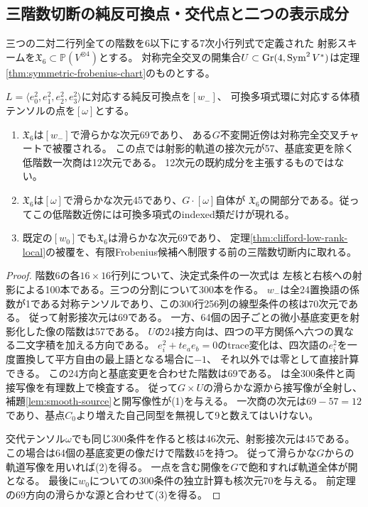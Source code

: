 \subsection{三階数切断の純反可換点・交代点と二つの表示成分}
三つの二対二行列全ての階数を6以下にする7次小行列式で定義された
射影スキームを$\mathfrak X_6\subset\mathbb P(V^{\otimes4})$とする。
対称完全交叉の開集合$U\subset\operatorname{Gr}(4,\operatorname{Sym}^2V^*)$は定理\ref{thm:symmetric-frobenius-chart}のものとする。

\begin{theorem}[自己同型が増える二点でも新しい低階数枝は現れない]\label{thm:pure-anti-and-alternating-local}
$L=\langle e_0^2,e_1^2,e_2^2,e_3^2\rangle$に対応する純反可換点を$[w_-]$、
可換多項式環に対応する体積テンソルの点を$[\omega]$とする。
\begin{enumerate}
\item $\mathfrak X_6$は$[w_-]$で滑らかな次元69であり、
ある$G$不変開近傍は対称完全交叉チャートで被覆される。
この点では射影的軌道の接次元が57、基底変更を除く低階数一次商は12次元である。
12次元の既約成分を主張するものではない。
\item $\mathfrak X_6$は$[\omega]$で滑らかな次元45であり、$G\cdot[\omega]$自体が
$\mathfrak X_6$の開部分である。従ってこの低階数近傍には可換多項式のindexed類だけが現れる。
\item 既定の$[w_0]$でも$\mathfrak X_6$は滑らかな次元69であり、
定理\ref{thm:clifford-low-rank-local}の被覆を、有限Frobenius候補へ制限する前の三階数切断内に取れる。
\end{enumerate}
\end{theorem}
\begin{proof}
階数6の各$16\times16$行列について、決定式条件の一次式は
左核と右核への射影による100本である。三つの分割について300本を作る。
$w_-$は全24置換語の係数が1である対称テンソルであり、この300行256列の線型条件の核は70次元である。
従って射影接次元は69である。
一方、64個の因子ごとの微小基底変更を射影化した像の階数は57である。
$U$の24接方向は、四つの平方関係へ六つの異なる二文字積を加える方向である。
$e_i^2+t e_ae_b=0$のtrace変化は、四次語の$e_i^2$を一度置換して平方自由の最上語となる場合に$-1$、
それ以外では零として直接計算できる。
この24方向と基底変更を合わせた階数は69である。
は全300条件と両接写像を有理数上で検査する。
従って$G\times U$の滑らかな源から接写像が全射し、補題\ref{lem:smooth-source}と開写像性が(1)を与える。
一次商の次元は$69-57=12$であり、基点$C_0$より増えた自己同型を無視して9と数えてはいけない。

交代テンソル$\omega$でも同じ300条件を作ると核は46次元、射影接次元は45である。
この場合は64個の基底変更の像だけで階数45を持つ。
従って滑らかな$G$からの軌道写像を用いれば(2)を得る。
一点を含む開像を$G$で飽和すれば軌道全体が開となる。
最後に$w_0$についての300条件の独立計算も核次元70を与える。
前定理の69方向の滑らかな源と合わせて(3)を得る。
\end{proof}

